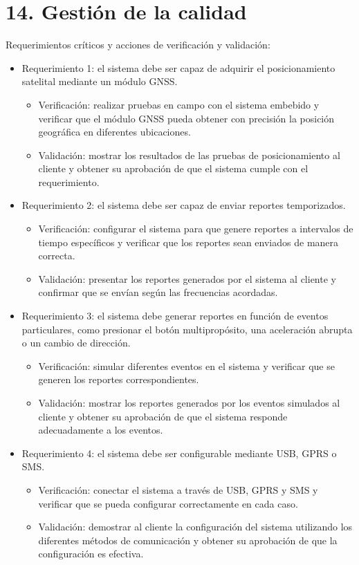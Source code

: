 \documentclass[
11pt, %
codirector, %
]{charter}
\begin{document}
\section{14. Gestión de la calidad}
\label{sec:calidad}
Requerimientos críticos y acciones de verificación y validación:
\begin{itemize} 
    \item Requerimiento 1: el sistema debe ser capaz de adquirir el posicionamiento satelital mediante un módulo GNSS.
    \begin{itemize}
    	\item Verificación: realizar pruebas en campo con el sistema embebido y verificar que el módulo GNSS pueda obtener con precisión la posición geográfica en diferentes ubicaciones.
    	\item Validación: mostrar los resultados de las pruebas de posicionamiento al cliente y obtener su aprobación de que el sistema cumple con el requerimiento.
    \end{itemize}
    
    \item Requerimiento 2: el sistema debe ser capaz de enviar reportes temporizados.
    \begin{itemize}    
    	\item Verificación: configurar el sistema para que genere reportes a intervalos de tiempo específicos y verificar que los reportes sean enviados de manera correcta.
    	\item Validación: presentar los reportes generados por el sistema al cliente y confirmar que se envían según las frecuencias acordadas.
    \end{itemize}

    \item Requerimiento 3: el sistema debe generar reportes en función de eventos particulares, como presionar el botón multipropósito, una aceleración abrupta o un cambio de dirección.
    \begin{itemize}    
    	\item Verificación: simular diferentes eventos en el sistema y verificar que se generen los reportes correspondientes.
    	\item Validación: mostrar los reportes generados por los eventos simulados al cliente y obtener su aprobación de que el sistema responde adecuadamente a los eventos.
    \end{itemize}

    \item Requerimiento 4: el sistema debe ser configurable mediante USB, GPRS o SMS.
    \begin{itemize}    
    	\item Verificación: conectar el sistema a través de USB, GPRS y SMS y verificar que se pueda configurar correctamente en cada caso.
    	\item Validación: demostrar al cliente la configuración del sistema utilizando los diferentes métodos de comunicación y obtener su aprobación de que la configuración es efectiva.
    \end{itemize}


\end{itemize}
\end{document}
